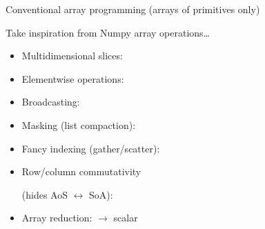 \documentclass[aspectratio=169]{beamer}
\begin{document}
\begin{frame}{Conventional array programming (arrays of primitives only)}
\vspace{0.5 cm}

{\Large Take inspiration from Numpy array operations\ldots}

\vspace{0.25 cm}
\begin{itemize}\setlength{\itemsep}{0.15 cm}
\item Multidimensional slices: 
\item Elementwise operations: 
\item Broadcasting: 
\item Masking (list compaction): 
\item Fancy indexing (gather/scatter): 
\item Row/column commutativity 

(hides AoS $\leftrightarrow$ SoA): 
\item Array reduction:  $\to$ scalar
\end{itemize}
\end{frame}
\end{document}
